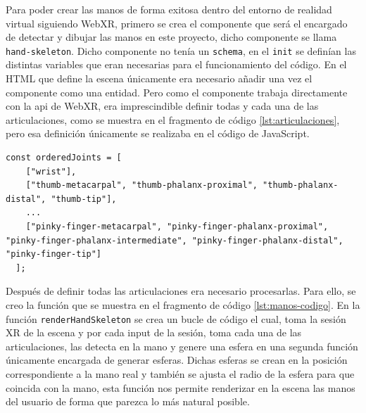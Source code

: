 \documentclass[a4paper, 12pt]{book}
\begin{document}
Para poder crear las manos de forma exitosa dentro del entorno de realidad virtual siguiendo WebXR, primero se crea el componente que será el encargado de detectar y dibujar las manos en este proyecto, dicho componente se llama \texttt{hand-skeleton}. Dicho componente no tenía un \texttt{schema}, en el \texttt{init} se definían las distintas variables que eran necesarias para el funcionamiento del código. 
En el HTML que define la escena únicamente era necesario añadir una vez el componente como una entidad. Pero como el componente trabaja directamente con la api de WebXR, era imprescindible definir todas y cada una de las articulaciones, como se muestra en el fragmento de código \ref{lst:articulaciones}, pero esa definición únicamente se realizaba en el código de JavaScript.
\begin{lstlisting}[caption=Definición de articulaciones, captionpos=b, label=lst:articulaciones]
  const orderedJoints = [
    ["wrist"],
    ["thumb-metacarpal", "thumb-phalanx-proximal", "thumb-phalanx-distal", "thumb-tip"],
    ...
    ["pinky-finger-metacarpal", "pinky-finger-phalanx-proximal", "pinky-finger-phalanx-intermediate", "pinky-finger-phalanx-distal", "pinky-finger-tip"]
  ];
\end{lstlisting}
Después de definir todas las articulaciones era necesario procesarlas. 
Para ello, se creo la función que se muestra en el fragmento de código \ref{lst:manos-codigo}. En la función \texttt{renderHandSkeleton} se crea un bucle de código el cual, toma la sesión XR de la escena y por cada input de la sesión, toma cada una de las articulaciones, las detecta en la mano y genere una esfera en una segunda función únicamente encargada de generar esferas. Dichas esferas se crean en la posición correspondiente a la mano real
y también se ajusta el radio de la esfera para que coincida con la mano, esta función nos permite renderizar en la escena las manos del usuario de forma que parezca lo más natural posible. 
\end{document}
